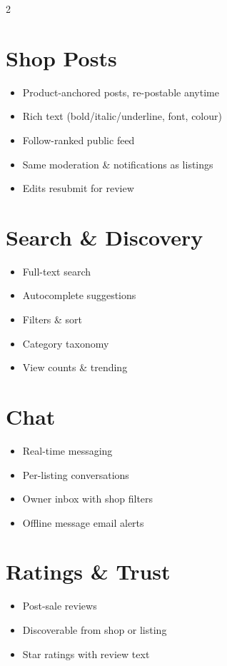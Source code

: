 \documentclass[11pt]{article}
\begin{document}
\begin{multicols}{2}
\section{Shop Posts}
\begin{itemize}
  \item Product-anchored posts, re-postable anytime
  \item Rich text (bold/italic/underline, font, colour)
  \item Follow-ranked public feed
  \item Same moderation \& notifications as listings
  \item Edits resubmit for review
\end{itemize}

\section{Search \& Discovery}
\begin{itemize}
  \item Full-text search
  \item Autocomplete suggestions
  \item Filters \& sort
  \item Category taxonomy
  \item View counts \& trending
\end{itemize}

\section{Chat}
\begin{itemize}
  \item Real-time messaging
  \item Per-listing conversations
  \item Owner inbox with shop filters
  \item Offline message email alerts
\end{itemize}

\section{Ratings \& Trust}
\begin{itemize}
  \item Post-sale reviews
  \item Discoverable from shop or listing
  \item Star ratings with review text
\end{itemize}


\end{multicols}
\end{document}
